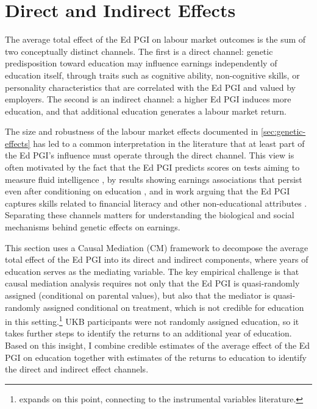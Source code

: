 \section{Direct and Indirect Effects}
\label{sec:direct}
The average total effect of the Ed PGI on labour market outcomes is the sum of two conceptually distinct channels.
The first is a direct channel: genetic predisposition toward education may influence earnings independently of education itself, through traits such as cognitive ability, non-cognitive skills, or personality characteristics that are correlated with the Ed PGI and valued by employers.
The second is an indirect channel: a higher Ed PGI induces more education, and that additional education generates a labour market return.

The size and robustness of the labour market effects documented in 
\autoref{sec:genetic-effects} has led to a common interpretation in the literature that at least part of the Ed PGI's influence must operate through the direct channel.
This view is often motivated by the fact that the Ed PGI predicts scores on tests aiming to measure fluid intelligence \citep{carvalho2024genetics}, by results showing earnings associations that persist even after conditioning on education \citep{papageorge2020genes,bryson2025gender}, and in work arguing that the Ed PGI captures skills related to financial literacy and other non-educational attributes \citep{barth2020genetic}.
Separating these channels matters for understanding the biological and social mechanisms behind genetic effects on earnings.

This section uses a Causal Mediation (CM) framework to decompose the average total effect of the Ed PGI into its direct and indirect components, where years of education serves as the mediating variable.
The key empirical challenge is that causal mediation analysis requires not only that the Ed PGI is quasi-randomly assigned (conditional on parental values), but also that the mediator is quasi-randomly assigned conditional on treatment, which is not credible for education in this setting.\footnote{
     expands on this point, connecting to the instrumental variables literature.
}
UKB participants were not randomly assigned education, so it takes further steps to identify the returns to an additional year of education.
Based on this insight, I combine credible estimates of the average effect of the Ed PGI on education together with estimates of the returns to education to identify the direct and indirect effect channels.


